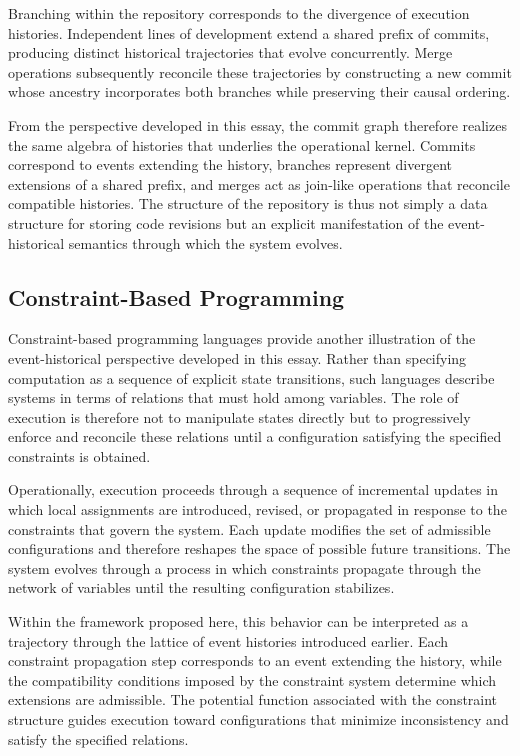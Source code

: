 \documentclass[12pt]{article}
\begin{document}
Branching within the repository corresponds to the
divergence of execution histories. Independent lines of
development extend a shared prefix of commits, producing
distinct historical trajectories that evolve concurrently.
Merge operations subsequently reconcile these trajectories
by constructing a new commit whose ancestry incorporates
both branches while preserving their causal ordering.

From the perspective developed in this essay, the commit
graph therefore realizes the same algebra of histories that
underlies the operational kernel. Commits correspond to
events extending the history, branches represent divergent
extensions of a shared prefix, and merges act as join-like
operations that reconcile compatible histories. The
structure of the repository is thus not simply a data
structure for storing code revisions but an explicit
manifestation of the event-historical semantics through
which the system evolves.

\subsection{Constraint-Based Programming}

Constraint-based programming languages provide another
illustration of the event-historical perspective developed
in this essay. Rather than specifying computation as a
sequence of explicit state transitions, such languages
describe systems in terms of relations that must hold
among variables. The role of execution is therefore not
to manipulate states directly but to progressively enforce
and reconcile these relations until a configuration
satisfying the specified constraints is obtained.

Operationally, execution proceeds through a sequence of
incremental updates in which local assignments are
introduced, revised, or propagated in response to the
constraints that govern the system. Each update modifies
the set of admissible configurations and therefore
reshapes the space of possible future transitions.
The system evolves through a process in which constraints
propagate through the network of variables until the
resulting configuration stabilizes.

Within the framework proposed here, this behavior can be
interpreted as a trajectory through the lattice of event
histories introduced earlier. Each constraint propagation
step corresponds to an event extending the history, while
the compatibility conditions imposed by the constraint
system determine which extensions are admissible. The
potential function associated with the constraint structure
guides execution toward configurations that minimize
inconsistency and satisfy the specified relations.
\end{document}
